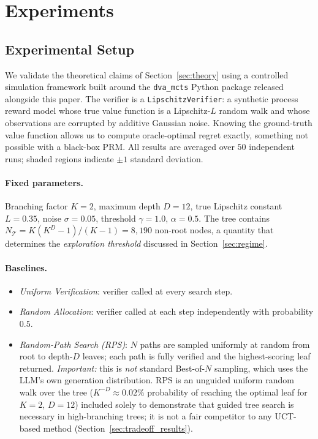 \section{Experiments}
\label{sec:experiments}

\subsection{Experimental Setup}

We validate the theoretical claims of Section~\ref{sec:theory} using a controlled
simulation framework built around the \texttt{dva\_mcts} Python package released
alongside this paper. The verifier is a \texttt{LipschitzVerifier}: a synthetic
process reward model whose true value function is a Lipschitz-$L$ random walk and
whose observations are corrupted by additive Gaussian noise. Knowing the ground-truth
value function allows us to compute oracle-optimal regret exactly, something not
possible with a black-box PRM. All results are averaged over $50$ independent runs;
shaded regions indicate $\pm 1$ standard deviation.

\paragraph{Fixed parameters.}
Branching factor $K{=}2$, maximum depth $D{=}12$, true Lipschitz constant $L{=}0.35$,
noise $\sigma{=}0.05$, threshold $\gamma{=}1.0$, $\alpha{=}0.5$.
The tree contains $N_{\mathcal{T}} = K(K^D-1)/(K-1) = 8{,}190$ non-root nodes, a quantity
that determines the \emph{exploration threshold} discussed in Section~\ref{sec:regime}.

\paragraph{Baselines.}
\begin{itemize}
  \item \textit{Uniform Verification}: verifier called at every search step.
  \item \textit{Random Allocation}: verifier called at each step independently
    with probability $0.5$.
  \item \textit{Random-Path Search (RPS)}: $N$ paths are sampled uniformly at
    random from root to depth-$D$ leaves; each path is fully verified and the
    highest-scoring leaf returned.  \emph{Important:} this is \emph{not} standard
    Best-of-$N$ sampling, which uses the LLM's own generation distribution.
    RPS is an unguided uniform random walk over the tree ($K^{-D} \approx 0.02\%$
    probability of reaching the optimal leaf for $K{=}2$, $D{=}12$) included solely
    to demonstrate that guided tree search is necessary in high-branching trees;
    it is not a fair competitor to any UCT-based method
    (Section~\ref{sec:tradeoff_results}).
\end{itemize}

